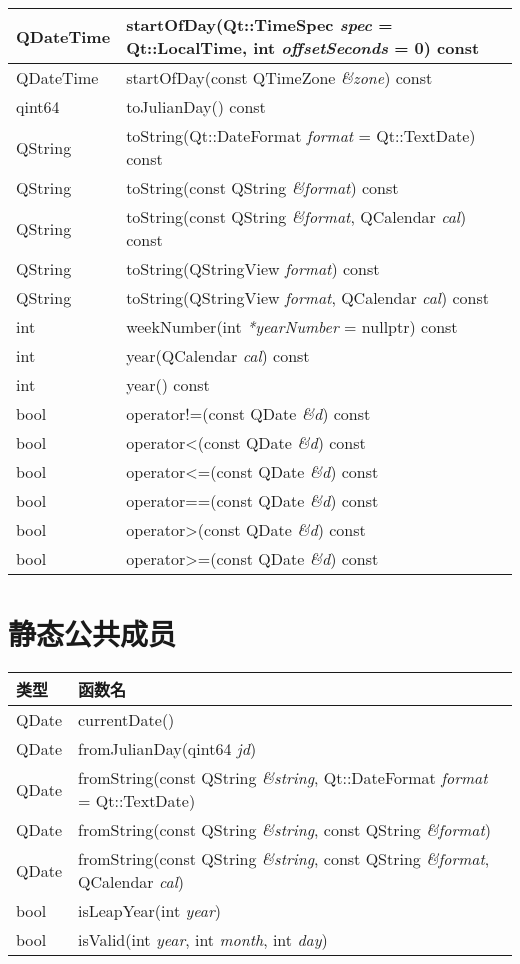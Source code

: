 \begin{longtable}{|l|m{30em}|}
\hline
QDateTime&	startOfDay(Qt::TimeSpec \emph{spec} = Qt::LocalTime, int \emph{offsetSeconds} = 0) const\\
\hline
QDateTime&	startOfDay(const QTimeZone \emph{\&zone}) const\\
\hline
qint64&	toJulianDay() const\\
\hline
QString&	toString(Qt::DateFormat \emph{format} = Qt::TextDate) const\\
\hline
QString&	toString(const QString \emph{\&format}) const\\
\hline
QString&	toString(const QString \emph{\&format}, QCalendar \emph{cal}) const\\
\hline
QString&	toString(QStringView \emph{format}) const\\
\hline
QString&	toString(QStringView \emph{format}, QCalendar \emph{cal}) const\\
\hline
int&	weekNumber(int \emph{*yearNumber} = nullptr) const\\
\hline
int&	year(QCalendar \emph{cal}) const\\
\hline
int&	year() const\\
\hline
bool&	operator!=(const QDate \emph{\&d}) const\\
\hline
bool&	operator<(const QDate \emph{\&d}) const\\
\hline
bool&	operator<=(const QDate \emph{\&d}) const\\
\hline
bool&	operator==(const QDate \emph{\&d}) const\\
\hline
bool&	operator>(const QDate \emph{\&d}) const\\
\hline
bool&	operator>=(const QDate \emph{\&d}) const\\
\hline
\end{longtable}

\section{静态公共成员}

\begin{tabular}{|l|l|}
\hline
类型&	函数名\\
\hline
QDate&	currentDate()\\
\hline
QDate&	fromJulianDay(qint64 \emph{jd})\\
\hline
QDate&	fromString(const QString \emph{\&string}, Qt::DateFormat \emph{format} = Qt::TextDate)\\
\hline
QDate&	fromString(const QString \emph{\&string}, const QString \emph{\&format})\\
\hline
QDate&	fromString(const QString \emph{\&string}, const QString \emph{\&format}, QCalendar \emph{cal})\\
\hline
bool&	isLeapYear(int \emph{year})\\
\hline
bool&	isValid(int \emph{year}, int \emph{month}, int \emph{day})\\
\hline
\end{tabular}

